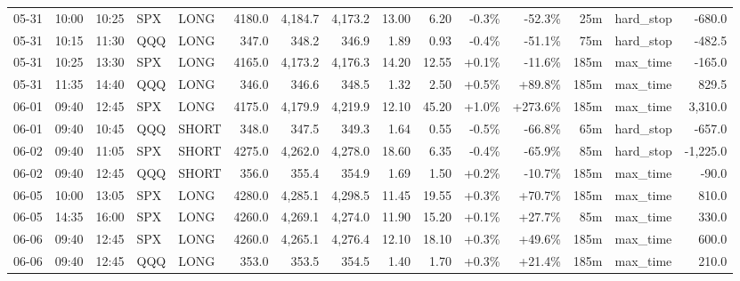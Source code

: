 \documentclass[11pt,a4paper,twoside]{article}
\begin{document}
\begin{landscape}
\begin{center}
\begin{longtable}{>{\color{txtmain}}l l l l l r r r r r r r r >{\color{txtmain}}l r}
05-31 & 10:00 & 10:25 & SPX & LONG & 4180.0 & 4,184.7 & 4,173.2 & 13.00 & 6.20 & \textcolor{lossred}{-0.3\%} & \textcolor{lossred}{-52.3\%} & 25m & hard\_stop & \textcolor{lossred}{-680.0} \\
05-31 & 10:15 & 11:30 & QQQ & LONG & 347.0 & 348.2 & 346.9 & 1.89 & 0.93 & \textcolor{lossred}{-0.4\%} & \textcolor{lossred}{-51.1\%} & 75m & hard\_stop & \textcolor{lossred}{-482.5} \\
05-31 & 10:25 & 13:30 & SPX & LONG & 4165.0 & 4,173.2 & 4,176.3 & 14.20 & 12.55 & \textcolor{wingreen}{+0.1\%} & \textcolor{lossred}{-11.6\%} & 185m & max\_time & \textcolor{lossred}{-165.0} \\
05-31 & 11:35 & 14:40 & QQQ & LONG & 346.0 & 346.6 & 348.5 & 1.32 & 2.50 & \textcolor{wingreen}{+0.5\%} & \textcolor{wingreen}{+89.8\%} & 185m & max\_time & \textcolor{wingreen}{829.5} \\
06-01 & 09:40 & 12:45 & SPX & LONG & 4175.0 & 4,179.9 & 4,219.9 & 12.10 & 45.20 & \textcolor{wingreen}{+1.0\%} & \textcolor{wingreen}{+273.6\%} & 185m & max\_time & \textcolor{wingreen}{3,310.0} \\
06-01 & 09:40 & 10:45 & QQQ & SHORT & 348.0 & 347.5 & 349.3 & 1.64 & 0.55 & \textcolor{lossred}{-0.5\%} & \textcolor{lossred}{-66.8\%} & 65m & hard\_stop & \textcolor{lossred}{-657.0} \\
06-02 & 09:40 & 11:05 & SPX & SHORT & 4275.0 & 4,262.0 & 4,278.0 & 18.60 & 6.35 & \textcolor{lossred}{-0.4\%} & \textcolor{lossred}{-65.9\%} & 85m & hard\_stop & \textcolor{lossred}{-1,225.0} \\
06-02 & 09:40 & 12:45 & QQQ & SHORT & 356.0 & 355.4 & 354.9 & 1.69 & 1.50 & \textcolor{wingreen}{+0.2\%} & \textcolor{lossred}{-10.7\%} & 185m & max\_time & \textcolor{lossred}{-90.0} \\
06-05 & 10:00 & 13:05 & SPX & LONG & 4280.0 & 4,285.1 & 4,298.5 & 11.45 & 19.55 & \textcolor{wingreen}{+0.3\%} & \textcolor{wingreen}{+70.7\%} & 185m & max\_time & \textcolor{wingreen}{810.0} \\
06-05 & 14:35 & 16:00 & SPX & LONG & 4260.0 & 4,269.1 & 4,274.0 & 11.90 & 15.20 & \textcolor{wingreen}{+0.1\%} & \textcolor{wingreen}{+27.7\%} & 85m & max\_time & \textcolor{wingreen}{330.0} \\
06-06 & 09:40 & 12:45 & SPX & LONG & 4260.0 & 4,265.1 & 4,276.4 & 12.10 & 18.10 & \textcolor{wingreen}{+0.3\%} & \textcolor{wingreen}{+49.6\%} & 185m & max\_time & \textcolor{wingreen}{600.0} \\
06-06 & 09:40 & 12:45 & QQQ & LONG & 353.0 & 353.5 & 354.5 & 1.40 & 1.70 & \textcolor{wingreen}{+0.3\%} & \textcolor{wingreen}{+21.4\%} & 185m & max\_time & \textcolor{wingreen}{210.0} \\

\end{longtable}
\end{center}
\end{landscape}
\end{document}
